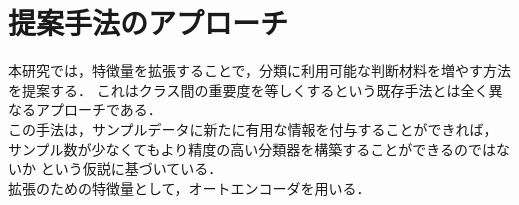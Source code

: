 \section{提案手法のアプローチ}

本研究では，特徴量を拡張することで，分類に利用可能な判断材料を増やす方法を提案する．
これはクラス間の重要度を等しくするという既存手法とは全く異なるアプローチである．\\
この手法は，サンプルデータに新たに有用な情報を付与することができれば，
サンプル数が少なくてもより精度の高い分類器を構築することができるのではないか
という仮説に基づいている．\\
拡張のための特徴量として，オートエンコーダを用いる．

